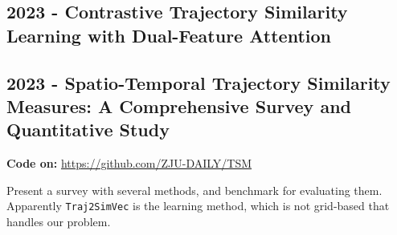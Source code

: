 \subsection*{2023 - Contrastive Trajectory Similarity Learning with Dual-Feature Attention}
\cite{chang2023contrastive}

\subsection*{2023 - Spatio-Temporal Trajectory Similarity Measures: A Comprehensive Survey and Quantitative Study}
\cite{hu2023spatio}

\textbf{Code on:} \url{https://github.com/ZJU-DAILY/TSM}

Present a survey with several methods, and benchmark for evaluating them. Apparently \texttt{Traj2SimVec} \cite{zhang2020trajectory} is the learning method, which is not grid-based that handles our problem.